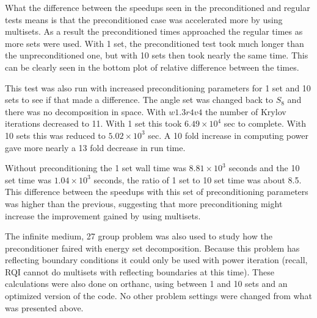 What the difference between the speedups seen in the preconditioned and regular tests means is that the preconditioned case was accelerated more by using multisets. As a result the preconditioned times approached the regular times as more sets were used. With 1 set, the preconditioned test took much longer than the unpreconditioned one, but with 10 sets then took nearly the same time. This can be clearly seen in the bottom plot of relative difference between the times. 

This test was also run with increased preconditioning parameters for 1 set and 10 sets to see if that made a difference. The angle set was changed back to $S_{8}$ and there was no decomposition in space. With $w1.3r4v4$ the number of Krylov iterations decreased to 11. With 1 set this took $6.49 \times 10^{4}$ sec to complete. With 10 sets this was reduced to $5.02 \times 10^{3}$ sec. A 10 fold increase in computing power gave more nearly a 13 fold decrease in run time. 

Without preconditioning the 1 set wall time was $8.81 \times 10^{3}$ seconds and the 10 set time was $1.04 \times 10^{3}$ seconds, the ratio of 1 set to 10 set time was about 8.5. This difference between the speedups with this set of preconditioning parameters was higher than the previous, suggesting that more preconditioning might increase the improvement gained by using multisets.

The infinite medium, 27 group problem was also used to study how the preconditioner faired with energy set decomposition. Because this problem has reflecting boundary conditions it could only be used with power iteration (recall, RQI cannot do multisets with reflecting boundaries at this time). These calculations were also done on orthanc, using between 1 and 10 sets and an optimized version of the code. No other problem settings were changed from what was presented above. 

